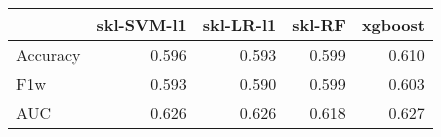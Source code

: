 \begin{tabular}{lrrrr}
\toprule
{} &  skl-SVM-l1 &  skl-LR-l1 &  skl-RF &  xgboost \\
\midrule
Accuracy &       0.596 &      0.593 &   0.599 &    0.610 \\
F1w      &       0.593 &      0.590 &   0.599 &    0.603 \\
AUC      &       0.626 &      0.626 &   0.618 &    0.627 \\
\bottomrule
\end{tabular}
